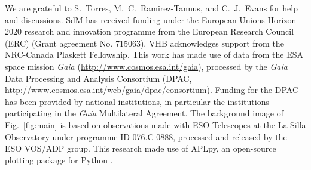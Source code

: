 \documentclass[a4paper,fleqn,usenatbib]{mnras}
\DeclareRobustCommand{\Figref}[1]{Fig.~\ref{#1}}
\begin{document}




\small
We are grateful to S.~Torres, M.~C.~Ramirez-Tannus,
and C.~J.~Evans for help and discussions. SdM has received funding under the European Unions Horizon 2020 research and innovation programme from the European Research Council (ERC) (Grant agreement No. 715063). VHB acknowledges support from the NRC-Canada Plaskett Fellowship. This work has made use of data from the ESA space mission \emph{Gaia} (\url{http://www.cosmos.esa.int/gaia}), processed by the \emph{Gaia} Data Processing and Analysis Consortium (DPAC, \url{http://www.cosmos.esa.int/web/gaia/dpac/consortium}). Funding for the DPAC has been provided by national institutions, in particular the institutions participating in the \emph{Gaia} Multilateral Agreement. The background image of \Figref{fig:main} is based on observations
made with ESO Telescopes at the La Silla Observatory under programme
ID 076.C-0888, processed and released by the ESO VOS/ADP group.
This research made use of APLpy, an open-source plotting package for Python \citep[][]{robitaille:12}.

\bsp	%
\label{lastpage}
\end{document}
